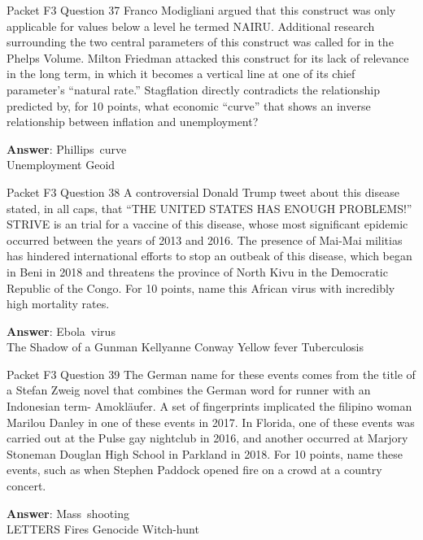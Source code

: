 \begin{frame}{Packet F3 Question 37}
Franco Modigliani argued that this construct was only applicable for values below a level he termed NAIRU. Additional research surrounding the two central parameters   of this construct was called for in the Phelps Volume. Milton Friedman attacked this construct for   its lack of relevance in the long term,   in which it becomes a vertical line at     one of its chief parameter's ``natural rate.'' Stagflation directly contradicts the relationship predicted by, for 10 points, what economic ``curve'' that shows an inverse relationship   between inflation and unemployment?

\textbf{Answer}: Phillips\ curve\\
 Unemployment
 Geoid
\end{frame}

\begin{frame}{Packet F3 Question 38}
A controversial Donald   Trump tweet about this   disease stated, in all caps, that ``THE UNITED STATES HAS ENOUGH PROBLEMS!'' STRIVE is an trial for a vaccine of this disease, whose most significant epidemic occurred between the years of 2013 and 2016. The presence of Mai-Mai militias has hindered international efforts to stop an outbeak of this disease, which began in Beni in 2018 and threatens the province of North Kivu in   the Democratic Republic of the Congo. For 10 points, name this African virus with incredibly high mortality rates.    

\textbf{Answer}: Ebola\ virus\\
 The Shadow of a Gunman
 Kellyanne Conway
 Yellow fever
 Tuberculosis
\end{frame}

\begin{frame}{Packet F3 Question 39}
The German name for these events comes from the title of a Stefan Zweig novel that combines the German   word for runner with an Indonesian term- Amokläufer. A set of fingerprints implicated the filipino woman Marilou Danley in one of these events in 2017. In Florida, one of these events was carried out at the Pulse gay nightclub in 2016, and another occurred at Marjory Stoneman Douglan High School in Parkland in 2018. For 10 points, name these events, such as when Stephen Paddock opened fire on a crowd at a country concert.      

\textbf{Answer}: Mass\ shooting\\
 LETTERS
 Fires
 Genocide
 Witch-hunt
\end{frame}

